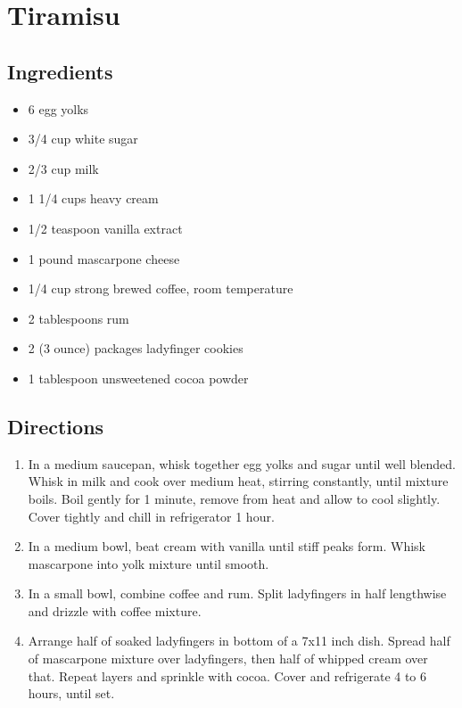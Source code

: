 \documentclass[oneside,11pt]{book}
\newcommand{\Ingredients}[1]{
    \subsection*{Ingredients}
    \begin{itemize} 
        #1 
    \end{itemize}
}
\newcommand{\Directions}[1]{
    \subsection*{Directions}
    \begin{enumerate} 
        #1 
    \end{enumerate}
}
\newcommand{\recipe}[3]{
    \pagebreak
    \section*{ \hspace{-12pt} #1 }
    \addcontentsline{toc}{section}{ \hspace{-6pt} #1 }
    
    \begin{minipage}[t]{0.35\textwidth}
        #2
    \end{minipage}
    \hspace{0.05\textwidth}
    \begin{minipage}[t]{0.6\textwidth}
        #3
    \end{minipage}
}
\begin{document}
    \recipe{Tiramisu}{
        \Ingredients{
            \item 6 egg yolks 
            \item 3/4 cup white sugar 
            \item 2/3 cup milk 
            \item 1 1/4 cups heavy cream 
            \item 1/2 teaspoon vanilla extract 
            \item 1 pound mascarpone cheese 
            \item 1/4 cup strong brewed coffee, room temperature
            \item 2 tablespoons rum 
            \item 2 (3 ounce) packages ladyfinger cookies 
            \item 1 tablespoon unsweetened cocoa powder
        }
    }{
        \Directions{
            \item In a medium saucepan, whisk together egg yolks and sugar until well blended. 
                Whisk in milk and cook over medium heat, stirring constantly, until mixture boils. 
                Boil gently for 1 minute, remove from heat and allow to cool slightly. 
                Cover tightly and chill in refrigerator 1 hour.
            \item In a medium bowl, beat cream with vanilla until stiff peaks form. 
                Whisk mascarpone into yolk mixture until smooth.
            \item In a small bowl, combine coffee and rum. 
                Split ladyfingers in half lengthwise and drizzle with coffee mixture.
            \item Arrange half of soaked ladyfingers in bottom of a 7x11 inch dish. 
                Spread half of mascarpone mixture over ladyfingers, then half of whipped cream over that. 
                Repeat layers and sprinkle with cocoa. Cover and refrigerate 4 to 6 hours, until set.
        }
    }
    
\end{document}

